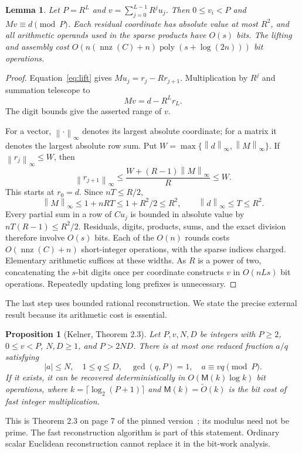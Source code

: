 \documentclass[11pt]{article}
\newtheorem{lemma}{Lemma}
\newtheorem{proposition}{Proposition}
\newcommand{\norm}[1]{\left\lVert#1\right\rVert}
\newcommand{\nnz}{\operatorname{nnz}}
\newcommand{\softO}{\widetilde O}
\begin{document}
\begin{lemma}\label{lem:lift}
Let $P=R^L$ and $v=\sum_{j=0}^{L-1}R^ju_j$. Then $0\leq v_i<P$ and
$Mv\equiv d\pmod P$. Each residual coordinate has absolute value at most
$R^2$, and all arithmetic operands used in the sparse products have $O(s)$
bits. The lifting and assembly cost
$O(n(\nnz(C)+n)\operatorname{poly}(s+\log(2n)))$ bit operations.
\end{lemma}
\begin{proof}
Equation~\eqref{eq:lift} gives $Mu_j=r_j-Rr_{j+1}$. Multiplication by $R^j$
and summation telescope to
\begin{equation}\label{eq:telescoping}
 Mv=d-R^Lr_L.
\end{equation}
The digit bounds give the asserted range of $v$.

For a vector, $\norm{\cdot}_\infty$ denotes its largest absolute coordinate;
for a matrix it denotes the largest absolute row sum. Put
$W=\max\{\norm{d}_\infty,\norm{M}_\infty\}$. If
$\norm{r_j}_\infty\leq W$, then
\[
 \norm{r_{j+1}}_\infty
 \leq\frac{W+(R-1)\norm{M}_\infty}{R}\leq W.
\]
This starts at $r_0=d$. Since $nT\leq R/2$,
\[
 \norm{M}_\infty\leq1+nRT\leq1+R^2/2\leq R^2,
 \qquad \norm{d}_\infty\leq T\leq R^2.
\]
Every partial sum in a row of $Cu_j$ is bounded in absolute value by
$nT(R-1)\leq R^2/2$. Residuals, digits, products, sums, and the exact
division therefore involve $O(s)$ bits. Each of the $O(n)$ rounds costs
$O(\nnz(C)+n)$ short-integer operations, with the sparse indices charged.
Elementary arithmetic suffices at these widths. As $R$ is a power of two,
concatenating the $s$-bit digits once per coordinate constructs $v$ in
$O(nLs)$ bit operations. Repeatedly updating long prefixes is unnecessary.
\end{proof}

The last step uses bounded rational reconstruction. We state the precise
external result because its arithmetic cost is essential.

\begin{proposition}[Kelner, Theorem 2.3]\label{prop:recovery}
Let $P,v,N,D$ be integers with $P\geq2$, $0\leq v<P$, $N,D\geq1$, and
$P>2ND$. There is at most one reduced fraction $a/q$ satisfying
\[
 |a|\leq N,\quad 1\leq q\leq D,\quad
 \gcd(q,P)=1,\quad a\equiv vq\pmod P.
\]
If it exists, it can be recovered deterministically in
$O(\mathsf M(k)\log k)$ bit operations, where
$k=\lceil\log_2(P+1)\rceil$ and $\mathsf M(k)=\softO(k)$ is the bit cost of
fast integer multiplication.
\end{proposition}
This is Theorem 2.3 on page 7 of the pinned version~\cite{kelner}; its modulus
need not be prime. The fast reconstruction algorithm is part of this
statement. Ordinary scalar Euclidean reconstruction cannot replace it in
the bit-work analysis.
\end{document}
